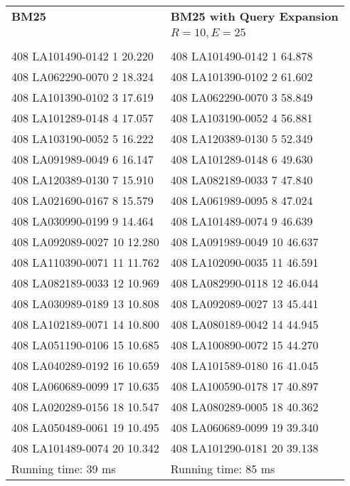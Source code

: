 \begin{tabular}{ l l }
\textbf{BM25} & \textbf{BM25 with Query Expansion}\\
              & $R = 10, E = 25$\\\\
408 LA101490-0142 1 20.220 & 408 LA101490-0142 1 64.878\\
408 LA062290-0070 2 18.324 & 408 LA101390-0102 2 61.602\\
408 LA101390-0102 3 17.619 & 408 LA062290-0070 3 58.849\\
408 LA101289-0148 4 17.057 & 408 LA103190-0052 4 56.881\\
408 LA103190-0052 5 16.222 & 408 LA120389-0130 5 52.349\\
408 LA091989-0049 6 16.147 & 408 LA101289-0148 6 49.630\\
408 LA120389-0130 7 15.910 & 408 LA082189-0033 7 47.840\\
408 LA021690-0167 8 15.579 & 408 LA061989-0095 8 47.024\\
408 LA030990-0199 9 14.464 & 408 LA101489-0074 9 46.639\\
408 LA092089-0027 10 12.280 & 408 LA091989-0049 10 46.637\\
408 LA110390-0071 11 11.762 & 408 LA102090-0035 11 46.591\\
408 LA082189-0033 12 10.969 & 408 LA082990-0118 12 46.044\\
408 LA030989-0189 13 10.808 & 408 LA092089-0027 13 45.441\\
408 LA102189-0071 14 10.800 & 408 LA080189-0042 14 44.945\\
408 LA051190-0106 15 10.685 & 408 LA100890-0072 15 44.270\\
408 LA040289-0192 16 10.659 & 408 LA101589-0180 16 41.045\\
408 LA060689-0099 17 10.635 & 408 LA100590-0178 17 40.897\\
408 LA020289-0156 18 10.547 & 408 LA080289-0005 18 40.362\\
408 LA050489-0061 19 10.495 & 408 LA060689-0099 19 39.340\\
408 LA101489-0074 20 10.342 & 408 LA101290-0181 20 39.138\\
Running time: 39 ms & Running time: 85 ms\\
\end{tabular}
